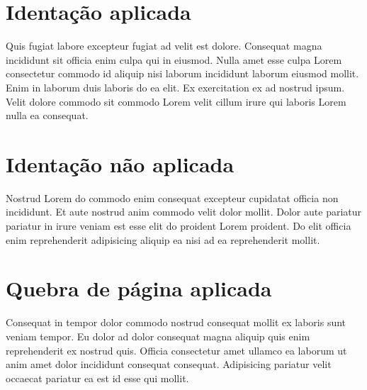 \documentclass{article}
\begin{document}
    \section{Identação aplicada}
    
    Quis fugiat labore excepteur fugiat ad velit est dolore. Consequat magna incididunt sit officia enim culpa qui in eiusmod. Nulla amet esse culpa Lorem consectetur commodo id aliquip nisi laborum incididunt laborum eiusmod mollit. Enim in laborum duis laboris do ea elit. Ex exercitation ex ad nostrud ipsum. Velit dolore commodo sit commodo Lorem velit cillum irure qui laboris Lorem nulla ea consequat.

    \section{Identação não aplicada}

    \noindent Nostrud Lorem do commodo enim consequat excepteur cupidatat officia non incididunt. Et aute nostrud anim commodo velit dolor mollit. Dolor aute pariatur pariatur in irure veniam est esse elit do proident Lorem proident. Do elit officia enim reprehenderit adipisicing aliquip ea nisi ad ea reprehenderit mollit. 
    
    \newpage

    \section{Quebra de página aplicada}
    
    Consequat in tempor dolor commodo nostrud consequat mollit ex laboris sunt veniam tempor. Eu dolor ad dolor consequat magna aliquip quis enim reprehenderit ex nostrud quis. Officia consectetur amet ullamco ea laborum ut anim amet dolor incididunt consequat consequat. Adipisicing pariatur velit occaecat pariatur ea est id esse qui mollit.
    
\end{document}
